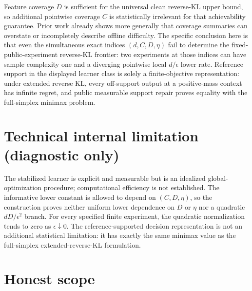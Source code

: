 \documentclass{article}
\begin{document}
Feature coverage \(D\) is sufficient for the universal clean reverse-KL upper bound, so additional pointwise coverage \(C\) is statistically irrelevant for that achievability guarantee. Prior work already shows more generally that coverage summaries can overstate or incompletely describe offline difficulty. The specific conclusion here is that even the simultaneous exact indices \((d,C,D,\eta)\) fail to determine the fixed-public-experiment reverse-KL frontier: two experiments at those indices can have sample complexity one and a diverging pointwise local \(d/\epsilon\) lower rate. Reference support in the displayed learner class is solely a finite-objective representation: under extended reverse KL, every off-support output at a positive-mass context has infinite regret, and public measurable support repair proves equality with the full-simplex minimax problem.

\section*{Technical internal limitation (diagnostic only)}

The stabilized learner is explicit and measurable but is an idealized global-optimization procedure; computational efficiency is not established. The informative lower constant is allowed to depend on \((C,D,\eta)\), so the construction proves neither uniform lower dependence on \(D\) or \(\eta\) nor a quadratic \(dD/\epsilon^2\) branch. For every specified finite experiment, the quadratic normalization tends to zero as \(\epsilon\downarrow0\). The reference-supported decision representation is not an additional statistical limitation: it has exactly the same minimax value as the full-simplex extended-reverse-KL formulation.

\section{Honest scope}
\end{document}
